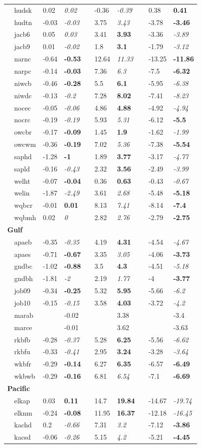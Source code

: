 \documentclass[10pt,letterpaper]{article}\usepackage[]{graphicx}\usepackage[]{color}
\begin{document}
\begin{table}[!tbp]
{\begin{center}
\begin{tabular}{lllcllcll}
~~hudsk&0.02&{\it 0.02}&&-0.36&{\it -0.39}&&0.38&{\bf 0.41}\tabularnewline
~~hudtn&-0.03&{\it -0.03}&&3.75&{\it 3.43}&&-3.78&{\bf -3.46}\tabularnewline
~~jacb6&0.05&{\it 0.03}&&3.41&{\bf 3.93}&&-3.36&{\it -3.89}\tabularnewline
~~jacb9&0.01&{\it -0.02}&&1.8&{\bf 3.1}&&-1.79&{\it -3.12}\tabularnewline
~~narnc&-0.64&{\bf -0.53}&&12.64&{\it 11.33}&&-13.25&{\bf -11.86}\tabularnewline
~~narpc&-0.14&{\bf -0.03}&&7.36&{\it 6.3}&&-7.5&{\bf -6.32}\tabularnewline
~~niwcb&-0.46&{\bf -0.28}&&5.5&{\bf 6.1}&&-5.95&{\it -6.38}\tabularnewline
~~niwdc&-0.13&{\it -0.2}&&7.28&{\bf 8.02}&&-7.41&{\it -8.23}\tabularnewline
~~nocec&-0.05&{\it -0.06}&&4.86&{\bf 4.88}&&-4.92&{\it -4.94}\tabularnewline
~~nocrc&-0.19&{\it -0.19}&&5.93&{\it 5.31}&&-6.12&{\bf -5.5}\tabularnewline
~~owcbr&-0.17&{\bf -0.09}&&1.45&{\bf 1.9}&&-1.62&{\it -1.99}\tabularnewline
~~owcwm&-0.36&{\bf -0.19}&&7.02&{\it 5.36}&&-7.38&{\bf -5.54}\tabularnewline
~~saphd&-1.28&{\bf -1}&&1.89&{\bf 3.77}&&-3.17&{\it -4.77}\tabularnewline
~~sapld&-0.16&{\it -0.43}&&2.32&{\bf 3.56}&&-2.49&{\it -3.99}\tabularnewline
~~welht&-0.07&{\bf -0.04}&&0.36&{\bf 0.63}&&-0.43&{\it -0.67}\tabularnewline
~~welin&-1.87&{\it -2.49}&&3.61&{\it 2.68}&&-5.48&{\bf -5.18}\tabularnewline
~~wqbcr&-0.01&{\bf 0.01}&&8.13&{\it 7.41}&&-8.14&{\bf -7.4}\tabularnewline
~~wqbmh&0.02&{\it 0}&&2.82&{\it 2.76}&&-2.79&{\bf -2.75}\tabularnewline
\hline
{\bfseries Gulf}&&&&&&&&\tabularnewline
~~apaeb&-0.35&{\it -0.35}&&4.19&{\bf 4.31}&&-4.54&{\it -4.67}\tabularnewline
~~apaes&-0.71&{\bf -0.67}&&3.35&{\it 3.05}&&-4.06&{\bf -3.73}\tabularnewline
~~gndbc&-1.02&{\bf -0.88}&&3.5&{\bf 4.3}&&-4.51&{\it -5.18}\tabularnewline
~~gndbh&-1.81&{\it -2}&&2.19&{\it 1.77}&&-4&{\bf -3.77}\tabularnewline
~~job09&-0.34&{\bf -0.25}&&5.32&{\bf 5.95}&&-5.66&{\it -6.2}\tabularnewline
~~job10&-0.15&{\it -0.15}&&3.58&{\bf 4.03}&&-3.72&{\it -4.2}\tabularnewline
~~marab&&-0.02&&&3.38&&&-3.4\tabularnewline
~~marce&&-0.01&&&3.62&&&-3.63\tabularnewline
~~rkbfb&-0.28&{\it -0.37}&&5.28&{\bf 6.25}&&-5.56&{\it -6.62}\tabularnewline
~~rkbfu&-0.33&{\it -0.41}&&2.95&{\bf 3.24}&&-3.28&{\it -3.64}\tabularnewline
~~wkbfr&-0.29&{\bf -0.14}&&6.27&{\bf 6.35}&&-6.57&{\bf -6.49}\tabularnewline
~~wkbwb&-0.29&{\bf -0.16}&&6.81&{\it 6.54}&&-7.1&{\bf -6.69}\tabularnewline
\hline
{\bfseries Pacific}&&&&&&&&\tabularnewline
~~elkap&0.03&{\bf 0.11}&&14.7&{\bf 19.84}&&-14.67&{\it -19.74}\tabularnewline
~~elknm&-0.24&{\bf -0.08}&&11.95&{\bf 16.37}&&-12.18&{\it -16.45}\tabularnewline
~~kachd&0.2&{\it -0.66}&&7.31&{\it 3.2}&&-7.12&{\bf -3.86}\tabularnewline
~~kacsd&-0.06&{\it -0.26}&&5.15&{\it 4.2}&&-5.21&{\bf -4.45}\tabularnewline

\end{tabular}
\end{center}}
\end{table}
\end{document}

